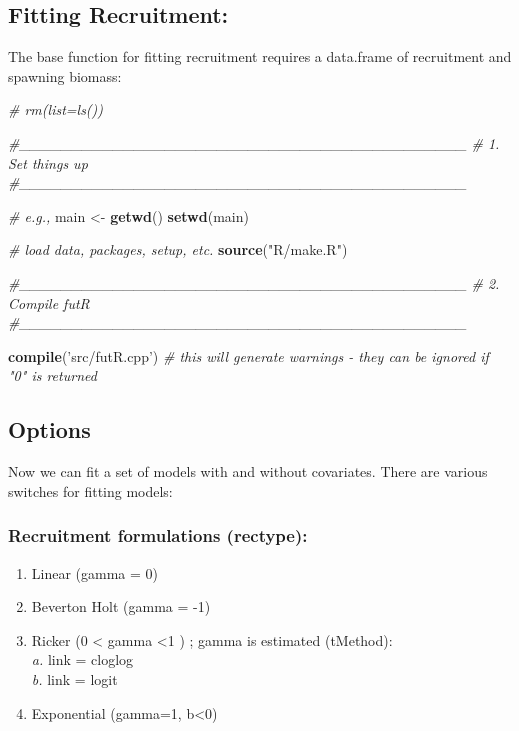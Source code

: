 \documentclass[]{article}
\newenvironment{Shaded}{\begin{snugshade}}{\end{snugshade}}
\newcommand{\KeywordTok}[1]{\textcolor[rgb]{0.13,0.29,0.53}{\textbf{{#1}}}}
\newcommand{\StringTok}[1]{\textcolor[rgb]{0.31,0.60,0.02}{{#1}}}
\newcommand{\CommentTok}[1]{\textcolor[rgb]{0.56,0.35,0.01}{\textit{{#1}}}}
\newcommand{\NormalTok}[1]{{#1}}
\providecommand{\tightlist}{%
  \setlength{\itemsep}{0pt}\setlength{\parskip}{0pt}}
\begin{document}
\subsection{Fitting Recruitment:}\label{fitting-recruitment}

The base function for fitting recruitment requires a data.frame of
recruitment and spawning biomass:

\begin{Shaded}
\begin{Highlighting}[]
 \CommentTok{# rm(list=ls())}
   
  \CommentTok{#___________________________________________}
  \CommentTok{# 1. Set things up}
  \CommentTok{#___________________________________________}
  
  \CommentTok{# e.g., }
  \NormalTok{main  <-}\StringTok{  }\KeywordTok{getwd}\NormalTok{()}
  \KeywordTok{setwd}\NormalTok{(main)}
  
  \CommentTok{# load data, packages, setup, etc.}
  \KeywordTok{source}\NormalTok{(}\StringTok{"R/make.R"}\NormalTok{)}
    
  \CommentTok{#___________________________________________}
  \CommentTok{# 2. Compile futR }
  \CommentTok{#___________________________________________}
  
  \KeywordTok{compile}\NormalTok{(}\StringTok{'src/futR.cpp'}\NormalTok{) }\CommentTok{# this will generate warnings - they can be ignored if "0" is returned}
\end{Highlighting}
\end{Shaded}

\subsection{Options}\label{options}

Now we can fit a set of models with and without covariates. There are
various switches for fitting models:

\subsubsection{Recruitment formulations
(rectype):}\label{recruitment-formulations-rectype}

\begin{enumerate}
\def\labelenumi{\arabic{enumi}.}
\tightlist
\item
  Linear (gamma = 0)
\item
  Beverton Holt (gamma = -1)
\item
  Ricker (0 \textless{} gamma \textless{}1 ) ; gamma is estimated
  (tMethod):\\
  \emph{a. }link = cloglog\\
  \emph{b. }link = logit
\item
  Exponential (gamma=1, b\textless{}0)
\end{enumerate}
\end{document}
